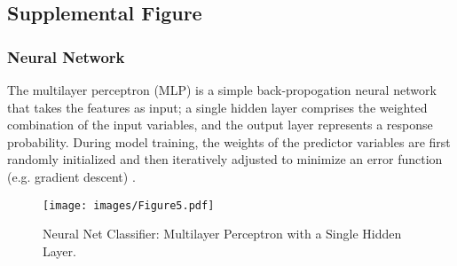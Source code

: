 \documentclass[sigconf]{acmart}
\begin{document}
\subsection{Supplemental Figure}

\subsubsection{Neural Network} The multilayer perceptron (MLP) is a simple
back-propogation neural network that takes the features as input; a single 
hidden layer comprises the weighted combination of the input variables, and 
the output layer represents a response probability. During model training, 
the weights of the predictor variables are first randomly initialized and 
then iteratively adjusted to minimize an error function (e.g. gradient 
descent) \cite{brown12}.

\begin{figure}[!ht]
  \centering\texttt{[image: images/Figure5.pdf]}
  \caption{Neural Net Classifier: Multilayer Perceptron with a Single Hidden Layer.}
  \label{f:Figure5}
\end{figure}
\end{document}
